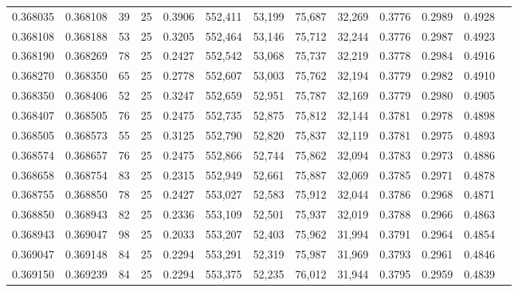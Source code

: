 \begin{tabular}{rrrrrrrrrrrrr}
0.368035 & 0.368108 &    39 &  25 &                                     0.3906 & 552,411 &  53,199 &  75,687 &  32,269 & 0.3776 & 0.2989 & 0.4928 \\
0.368108 & 0.368188 &    53 &  25 &                                     0.3205 & 552,464 &  53,146 &  75,712 &  32,244 & 0.3776 & 0.2987 & 0.4923 \\
0.368190 & 0.368269 &    78 &  25 &                                     0.2427 & 552,542 &  53,068 &  75,737 &  32,219 & 0.3778 & 0.2984 & 0.4916 \\
0.368270 & 0.368350 &    65 &  25 &                                     0.2778 & 552,607 &  53,003 &  75,762 &  32,194 & 0.3779 & 0.2982 & 0.4910 \\
0.368350 & 0.368406 &    52 &  25 &                                     0.3247 & 552,659 &  52,951 &  75,787 &  32,169 & 0.3779 & 0.2980 & 0.4905 \\
0.368407 & 0.368505 &    76 &  25 &                                     0.2475 & 552,735 &  52,875 &  75,812 &  32,144 & 0.3781 & 0.2978 & 0.4898 \\
0.368505 & 0.368573 &    55 &  25 &                                     0.3125 & 552,790 &  52,820 &  75,837 &  32,119 & 0.3781 & 0.2975 & 0.4893 \\
0.368574 & 0.368657 &    76 &  25 &                                     0.2475 & 552,866 &  52,744 &  75,862 &  32,094 & 0.3783 & 0.2973 & 0.4886 \\
0.368658 & 0.368754 &    83 &  25 &                                     0.2315 & 552,949 &  52,661 &  75,887 &  32,069 & 0.3785 & 0.2971 & 0.4878 \\
0.368755 & 0.368850 &    78 &  25 &                                     0.2427 & 553,027 &  52,583 &  75,912 &  32,044 & 0.3786 & 0.2968 & 0.4871 \\
0.368850 & 0.368943 &    82 &  25 &                                     0.2336 & 553,109 &  52,501 &  75,937 &  32,019 & 0.3788 & 0.2966 & 0.4863 \\
0.368943 & 0.369047 &    98 &  25 &                                     0.2033 & 553,207 &  52,403 &  75,962 &  31,994 & 0.3791 & 0.2964 & 0.4854 \\
0.369047 & 0.369148 &    84 &  25 &                                     0.2294 & 553,291 &  52,319 &  75,987 &  31,969 & 0.3793 & 0.2961 & 0.4846 \\
0.369150 & 0.369239 &    84 &  25 &                                     0.2294 & 553,375 &  52,235 &  76,012 &  31,944 & 0.3795 & 0.2959 & 0.4839 \\

\end{tabular}
